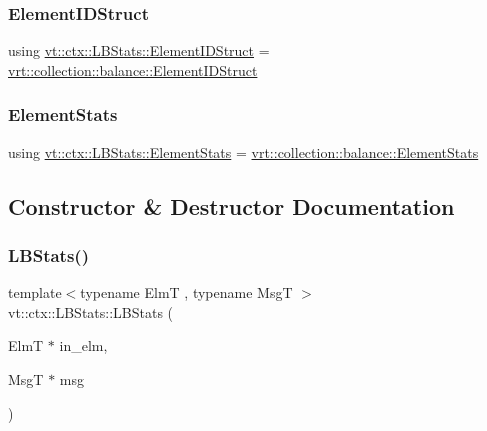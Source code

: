 \subsubsection{\texorpdfstring{Element\+I\+D\+Struct}{ElementIDStruct}}
{\footnotesize\ttfamily using \hyperlink{structvt_1_1ctx_1_1_l_b_stats_a9806d27212bffbbac72eb1e05f9e9880}{vt\+::ctx\+::\+L\+B\+Stats\+::\+Element\+I\+D\+Struct} =  \hyperlink{structvt_1_1vrt_1_1collection_1_1balance_1_1_element_i_d_struct}{vrt\+::collection\+::balance\+::\+Element\+I\+D\+Struct}}

\mbox{\label{structvt_1_1ctx_1_1_l_b_stats_aaf24fff3db7252f70df0a02e12966eb4}} 
\subsubsection{\texorpdfstring{Element\+Stats}{ElementStats}}
{\footnotesize\ttfamily using \hyperlink{structvt_1_1ctx_1_1_l_b_stats_aaf24fff3db7252f70df0a02e12966eb4}{vt\+::ctx\+::\+L\+B\+Stats\+::\+Element\+Stats} =  \hyperlink{structvt_1_1vrt_1_1collection_1_1balance_1_1_element_stats}{vrt\+::collection\+::balance\+::\+Element\+Stats}}



\subsection{Constructor \& Destructor Documentation}
\mbox{\label{structvt_1_1ctx_1_1_l_b_stats_aa1212c9a206b738a146981acbc48327d}} 
\subsubsection{\texorpdfstring{L\+B\+Stats()}{LBStats()}}
{\footnotesize\ttfamily template$<$typename ElmT , typename MsgT $>$ \\
vt\+::ctx\+::\+L\+B\+Stats\+::\+L\+B\+Stats (\begin{DoxyParamCaption}\item[{ElmT $\ast$}]{in\+\_\+elm,  }\item[{MsgT $\ast$}]{msg }\end{DoxyParamCaption})}



